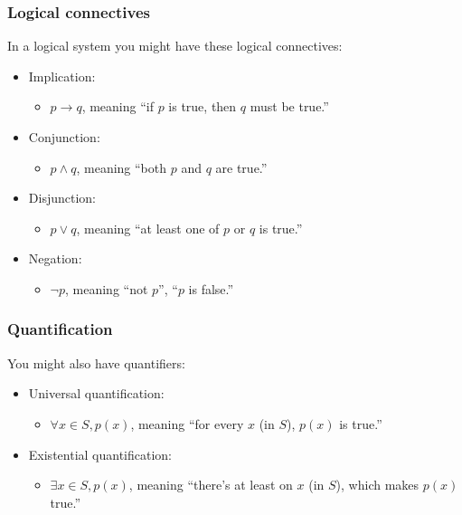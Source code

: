 \documentclass{beamer}
\begin{document}
\begin{frame}
  \frametitle{Logical connectives}

  In a logical system you might have these logical connectives:

  \begin{itemize}
  \pause
  \item Implication:
    \begin{itemize}
    \item $p \rightarrow q$, meaning ``if $p$ is true, then $q$ must be true.''
    \end{itemize}
  \pause
  \item Conjunction:
    \begin{itemize}
    \item $p \wedge q$, meaning ``both $p$ and $q$ are true.''
    \end{itemize}
  \pause
  \item Disjunction:
    \begin{itemize}
    \item $p \vee q$, meaning ``at least one of $p$ or $q$ is true.''
    \end{itemize}
  \pause
  \item Negation:
    \begin{itemize}
    \item $\neg p$, meaning ``not $p$'', ``$p$ is false.''
    \end{itemize}
  \end{itemize}
\end{frame}

\begin{frame}
  \frametitle{Quantification}
  You might also have quantifiers:

  \begin{itemize}
  \pause
  \item Universal quantification:
    \begin{itemize}
    \item $\forall x \in S, p(x)$, meaning ``for every $x$ (in $S$), $p(x)$ is true.''
    \end{itemize}
  \pause
  \item Existential quantification:
    \begin{itemize}
    \item $\exists x \in S, p(x)$, meaning ``there's at least on $x$ (in $S$), which makes $p(x)$ true.''
    \end{itemize}
  \end{itemize}
\end{frame}
\end{document}
